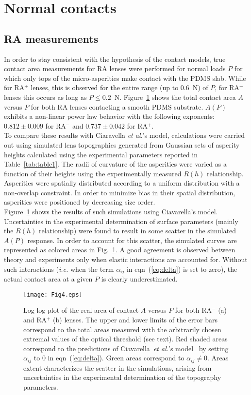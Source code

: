 \documentclass[pre,groupedaddress,showkeys,showpacs,twocolumn]{revtex4}
\begin{document}
\section*{Normal contacts}
%
\subsection*{RA measurements}
%
In order to stay consistent with the hypothesis of the contact models, true contact area measurements for RA lenses were performed for normal loads $P$ for which only tops of the micro-asperities make contact with the PDMS slab. While for RA$^+$ lenses, this is observed for the entire range (up to 0.6~N) of $P$, for RA$^-$ lenses this occurs as long as $P \leq 0.2$~N. Figure~\ref{fig:contact_area} shows the total contact area $A$ versus $P$ for both RA lenses contacting a smooth PDMS substrate. $A(P)$ exhibits a non-linear power law behavior with the following exponents: $0.812 \pm 0.009$ for RA$^-$ and $0.737 \pm 0.042$ for RA$^+$.\\ 
To compare these results with Ciaravella \textit{et al.}'s model, calculations were carried out using simulated lens topographies generated from Gaussian sets of asperity heights calculated using the experimental parameters reported in Table~\ref{tab:table1}. The radii of curvature of the asperities were varied as a function of their heights using the experimentally measured $R(h)$ relationship. Asperities were spatially distributed according to a uniform distribution with a non-overlap constraint. In order to minimize bias in their spatial distribution, asperities were positioned by decreasing size order.\\
Figure~\ref{fig:contact_area} shows the results of such simulations using Ciavarella's model. Uncertainties in the experimental determination of surface parameters (mainly the $R(h)$ relationship) were found to result in some scatter in the simulated $A(P)$ response. In order to account for this scatter, the simulated curves are represented as colored areas in Fig.~\ref{fig:contact_area}. A good agreement is observed between theory and experiments only when elastic interactions are accounted for. Without such interactions (\textit{i.e.} when the term $\alpha_{ij}$ in eqn~(\ref{eq:delta}) is set to zero), the actual contact area at a given $P$ is clearly underestimated.\\
%
\begin{figure}
	\texttt{[image: Fig4.eps]}
	\caption{Log-log plot of the real area of contact $A$ versus $P$ for both RA$^{-}$ (a) and RA$^{+}$ (b) lenses. The upper and lower limits of the error bars correspond to the total areas measured with the arbitrarily chosen extremal values of the optical threshold (see text). Red shaded areas correspond to the predictions of Ciavarella~\textit{et al.}'s model~\cite{ciavarella2006,ciavarella2008} by setting $\alpha_{ij}$ to 0 in eqn~(\ref{eq:delta}). Green areas correspond to $\alpha_{ij} \neq 0$. Areas extent characterizes the scatter in the simulations, arising from uncertainties in the experimental determination of the topography parameters.}
	\label{fig:contact_area} 
\end{figure}
%
\end{document}
